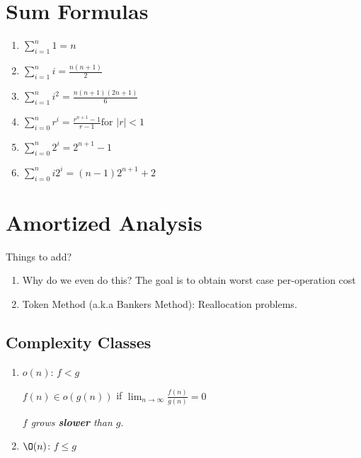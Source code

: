 \documentclass[12pt, letterpaper]{article}
\begin{document}
    \tiny
    \begin{multicols*}{3}

        \section{Sum Formulas}

        \begin{enumerate}
            \item $\sum_{i = 1}^{n} 1 = n$
            \item $\sum_{i = 1}^{n} i = \frac{n(n + 1)}{2}$
            \item $\sum_{i = 1}^{n} i^2 = \frac{n(n+1)(2n + 1)}{6}$
            \item $\sum_{i = 0}^{n} r^i = \frac{r^{n + 1} - 1}{r - 1} \text{for $|r| < 1$}$
            \item $\sum_{i = 0}^{n} 2^i = 2^{n + 1} - 1$
            \item $\sum_{i = 0}^{n} i 2^i = (n - 1) 2^{n + 1} + 2$
        \end{enumerate}

    
        \section{Amortized Analysis}

        Things to add?
        \begin{enumerate}
            \item Why do we even do this? The goal is to obtain worst case per-operation cost
            \item Token Method (a.k.a Bankers Method): Reallocation problems.
        \end{enumerate}

        \subsection{Complexity Classes}

        \begin{enumerate}
            \item $o(n)$: $f < g$
            
            $f(n) \in o(g(n))$ if $\lim_{n \to \infty} \frac{f(n)}{g(n)} = 0$
            
            {\it $f$ grows {\bf slower} than $g$}.
            
            \item $\O(n)$: $f \le g$


\end{enumerate}
\end{multicols*}
\end{document}
